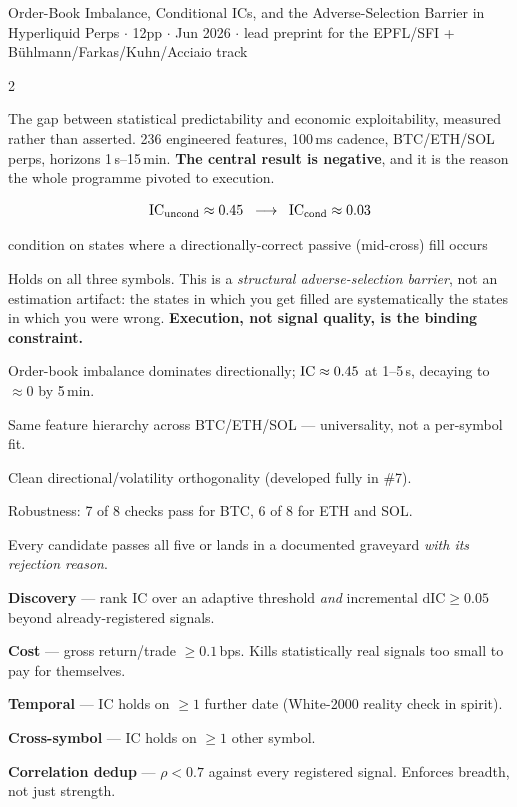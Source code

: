 \documentclass[10pt,a4paper]{article}
\begin{document}
\small

{Order-Book Imbalance, Conditional ICs, and the Adverse-Selection Barrier in Hyperliquid Perps}
{ $\cdot$ 12pp $\cdot$ Jun 2026 $\cdot$ lead preprint for the
 EPFL/SFI + Bühlmann/Farkas/Kuhn/Acciaio track}

\begin{multicols}{2}

The gap between statistical predictability and economic exploitability, measured rather than asserted.
236 engineered features, 100\,ms cadence, BTC/ETH/SOL perps, horizons 1\,s--15\,min. \textbf{The central
result is negative}, and it is the reason the whole programme pivoted to execution.

\[
  \operatorname{IC}_{\text{uncond}} \approx 0.45
  \;\;\longrightarrow\;\;
  \operatorname{IC}_{\text{cond}} \approx 0.03
\]
\vspace{-4pt}
\begin{center}
{\scriptsize condition on states where a directionally-correct passive (mid-cross) fill occurs}
\end{center}
Holds on all three symbols. This is a \emph{structural adverse-selection barrier}, not an estimation
artifact: the states in which you get filled are systematically the states in which you were wrong.
\textbf{Execution, not signal quality, is the binding constraint.}

\begin{opitems}
\item Order-book imbalance dominates directionally; $\operatorname{IC}\approx0.45$ at 1--5\,s, decaying to $\approx0$
      by 5\,min.
\item Same feature hierarchy across BTC/ETH/SOL — universality, not a per-symbol fit.
\item Clean directional/volatility orthogonality (developed fully in \#7).
\item Robustness: 7 of 8 checks pass for BTC, 6 of 8 for ETH and SOL.
\end{opitems}

Every candidate passes all five or lands in a documented graveyard \emph{with its rejection reason}.
\begin{opitems}
\item[\textbf{G1}] \textbf{Discovery} — rank IC over an adaptive threshold \emph{and} incremental
      $\mathrm{dIC}\ge0.05$ beyond already-registered signals.
\item[\textbf{G2}] \textbf{Cost} — gross return/trade $\ge 0.1$\,bps. Kills statistically real signals
      too small to pay for themselves.
\item[\textbf{G3}] \textbf{Temporal} — IC holds on $\ge1$ further date (White-2000 reality check in
      spirit).
\item[\textbf{G4}] \textbf{Cross-symbol} — IC holds on $\ge1$ other symbol.
\item[\textbf{G5}] \textbf{Correlation dedup} — $\rho<0.7$ against every registered signal. Enforces
      breadth, not just strength.
\end{opitems}


\end{multicols}
\end{document}
